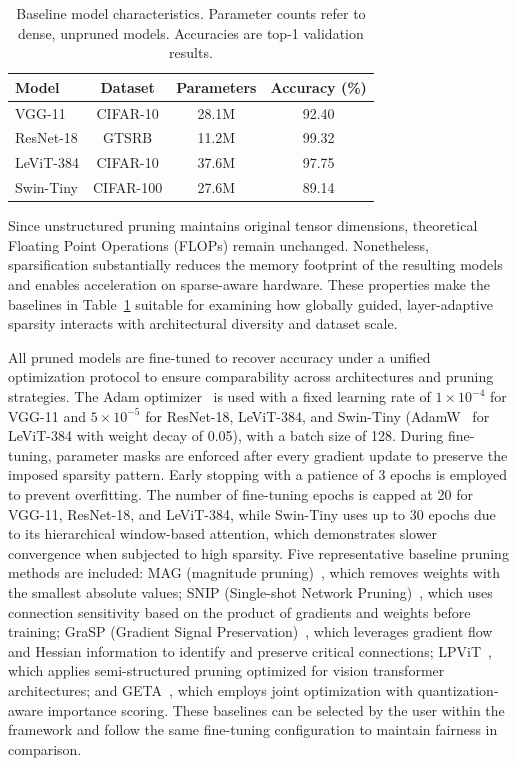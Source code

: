 \documentclass[11pt, conference]{IEEEtran}
\begin{document}
\begin{table}[!ht]
\centering
\caption{Baseline model characteristics. Parameter counts refer to dense, unpruned models. Accuracies are top-1 validation results.}
\label{tab:baselines}
\begin{tabular}{lccc}
\toprule
Model & Dataset & Parameters & Accuracy (\%) \\
\midrule
VGG-11 & CIFAR-10 & 28.1M & 92.40 \\
ResNet-18 & GTSRB & 11.2M & 99.32 \\
LeViT-384 & CIFAR-10 & 37.6M & 97.75 \\
Swin-Tiny & CIFAR-100 & 27.6M & 89.14 \\
\bottomrule
\end{tabular}
\end{table}

Since unstructured pruning maintains original tensor dimensions, theoretical Floating Point Operations (FLOPs) remain unchanged. Nonetheless, sparsification substantially reduces the memory footprint of the resulting models and enables acceleration on sparse-aware hardware. These properties make the baselines in Table~\ref{tab:baselines} suitable for examining how globally guided, layer-adaptive sparsity interacts with architectural diversity and dataset scale.


All pruned models are fine-tuned to recover accuracy under a unified optimization protocol to ensure comparability across architectures and pruning strategies. The Adam optimizer~\cite{kingma2014adam} is used with a fixed learning rate of $1 \times 10^{-4}$ for VGG-11 and $5 \times 10^{-5}$ for ResNet-18, LeViT-384, and Swin-Tiny (AdamW~\cite{loshchilov2019decoupled} for LeViT-384 with weight decay of 0.05), with a batch size of 128. During fine-tuning, parameter masks are enforced after every gradient update to preserve the imposed sparsity pattern. Early stopping with a patience of 3 epochs is employed to prevent overfitting. The number of fine-tuning epochs is capped at 20 for VGG-11, ResNet-18, and LeViT-384, while Swin-Tiny uses up to 30 epochs due to its hierarchical window-based attention, which demonstrates slower convergence when subjected to high sparsity. Five representative baseline pruning methods are included: MAG (magnitude pruning)~\cite{han2015learning}, which removes weights with the smallest absolute values; SNIP (Single-shot Network Pruning)~\cite{lee2018snip}, which uses connection sensitivity based on the product of gradients and weights before training; GraSP (Gradient Signal Preservation)~\cite{wang2020picking}, which leverages gradient flow and Hessian information to identify and preserve critical connections; LPViT~\cite{wu2025lpvit}, which applies semi-structured pruning optimized for vision transformer architectures; and GETA~\cite{geta2025}, which employs joint optimization with quantization-aware importance scoring. These baselines can be selected by the user within the framework and follow the same fine-tuning configuration to maintain fairness in comparison.
\end{document}
